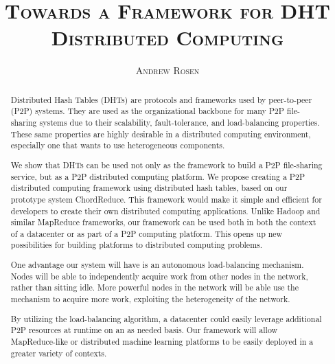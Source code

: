 \documentclass[11pt,letterpaper,titlepage]{report}
\title{\textsc{Towards a Framework for DHT Distributed Computing}}
\author{\textsc{Andrew Rosen}}
\date{}
\begin{document}
	
	\begin{abstract}
		Distributed Hash Tables (DHTs) are protocols and frameworks used by peer-to-peer (P2P) systems.
		They are used as the organizational backbone for many P2P file-sharing systems due to their scalability, fault-tolerance, and load-balancing properties.
		These same properties are highly desirable in a distributed computing environment, especially one that wants to use heterogeneous components.
		
		We show that DHTs can be used not only as the framework to build a P2P file-sharing service, but as a P2P distributed computing platform.
		We propose creating a P2P distributed computing framework using distributed hash tables, based on our prototype system ChordReduce.
		This framework would make it simple and efficient for developers to create their own distributed computing applications.
		Unlike Hadoop and similar MapReduce frameworks, our framework can be used both in both the context of a datacenter or as part of a P2P computing platform.  
		This opens up new possibilities for building platforms to distributed computing problems.
		
		One advantage our system will have is an autonomous load-balancing mechanism.
		Nodes will be able to independently acquire work from other nodes in the network, rather than sitting idle.
		More powerful nodes in the network will be able use the mechanism to acquire more work, exploiting the heterogeneity of the network.
		
		By utilizing the load-balancing algorithm, a datacenter could easily leverage additional P2P resources at runtime on an as needed basis.
		Our framework will allow MapReduce-like or distributed machine learning platforms to be easily deployed in a greater variety of contexts.
		
		
	\end{abstract}

	\maketitle
	
	\newpage 
	
	
	\null\vfill
	\newpage
	
\end{document}
